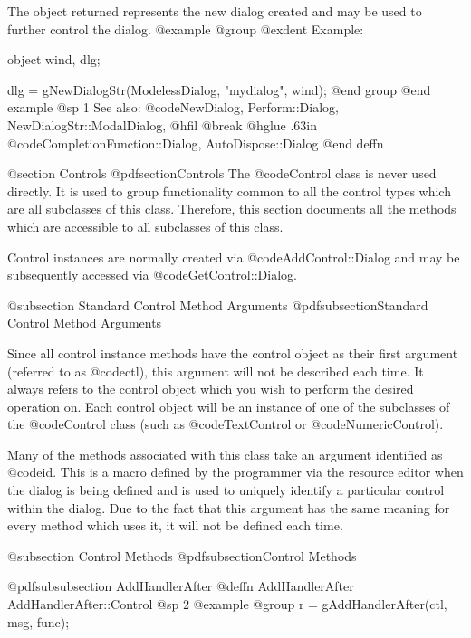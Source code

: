 The object returned represents the new dialog created and may be
used to further control the dialog.
@example
@group
@exdent Example:

object  wind, dlg;

dlg = gNewDialogStr(ModelessDialog, "mydialog", wind);
@end group
@end example
@sp 1
See also:  @code{NewDialog, Perform::Dialog, NewDialogStr::ModalDialog,}
@hfil @break @hglue .63in @code{CompletionFunction::Dialog, AutoDispose::Dialog}
@end deffn






@section Controls
@pdfsection{Controls}
The @code{Control} class is never used directly.  It is used to group
functionality common to all the control types which are all subclasses
of this class.  Therefore, this section documents all the methods which
are accessible to all subclasses of this class.


Control instances are normally created via @code{AddControl::Dialog}
and may be subsequently accessed via @code{GetControl::Dialog}.



@subsection  Standard Control Method Arguments
@pdfsubsection{Standard Control Method Arguments}

Since all control instance methods have the control object as their
first argument (referred to as @code{ctl}), this argument will not be
described each time.  It always refers to the control object which you
wish to perform the desired operation on.  Each control object will be
an instance of one of the subclasses of the @code{Control} class (such
as @code{TextControl} or @code{NumericControl}).


Many of the methods associated with this class take an argument
identified as @code{id}.  This is a macro defined by the programmer via
the resource editor when the dialog is being defined and is used to
uniquely identify a particular control within the dialog.  Due to the
fact that this argument has the same meaning for every method which
uses it, it will not be defined each time.


@subsection Control Methods
@pdfsubsection{Control Methods}












@pdfsubsubsection {AddHandlerAfter}
@deffn {AddHandlerAfter} AddHandlerAfter::Control
@sp 2
@example
@group
r = gAddHandlerAfter(ctl, msg, func);

